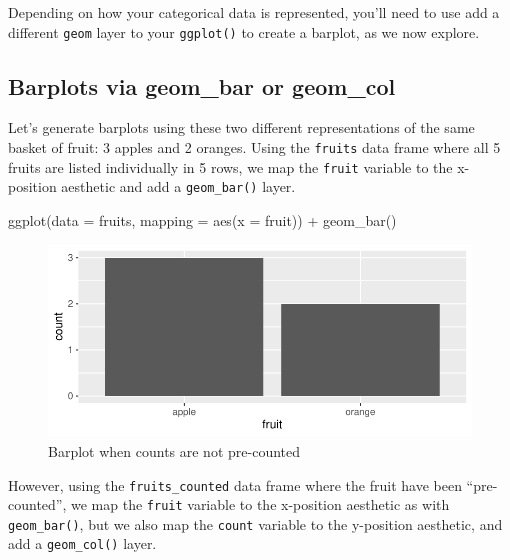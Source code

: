 \documentclass[
  letterpaper,
  DIV=11,
  numbers=noendperiod]{scrreprt}
\newenvironment{Shaded}{\begin{snugshade}}{\end{snugshade}}
\newcommand{\AttributeTok}[1]{\textcolor[rgb]{0.40,0.45,0.13}{#1}}
\newcommand{\FunctionTok}[1]{\textcolor[rgb]{0.28,0.35,0.67}{#1}}
\newcommand{\NormalTok}[1]{\textcolor[rgb]{0.00,0.23,0.31}{#1}}
\newcommand{\SpecialCharTok}[1]{\textcolor[rgb]{0.37,0.37,0.37}{#1}}
\theoremstyle{definition}
\theoremstyle{remark}
\begin{document}
Depending on how your categorical data is represented, you'll need to
use add a different \texttt{geom} layer to your \texttt{ggplot()} to
create a barplot, as we now explore.

\hypertarget{barplots-via-geom_bar-or-geom_col}{%
\subsection{Barplots via geom\_bar or
geom\_col}\label{barplots-via-geom_bar-or-geom_col}}

Let's generate barplots using these two different representations of the
same basket of fruit: 3 apples and 2 oranges. Using the \texttt{fruits}
data frame where all 5 fruits are listed individually in 5 rows, we map
the \texttt{fruit} variable to the x-position aesthetic and add a
\texttt{geom\_bar()} layer.

\begin{Shaded}
\begin{Highlighting}[]
\FunctionTok{ggplot}\NormalTok{(}\AttributeTok{data =}\NormalTok{ fruits, }\AttributeTok{mapping =} \FunctionTok{aes}\NormalTok{(}\AttributeTok{x =}\NormalTok{ fruit)) }\SpecialCharTok{+}
  \FunctionTok{geom\_bar}\NormalTok{()}
\end{Highlighting}
\end{Shaded}

\begin{figure}[H]

{\centering \includegraphics{02-visualization_files/figure-pdf/fig-geombar-1.pdf}

}

\caption{\label{fig-geombar}Barplot when counts are not pre-counted}

\end{figure}

However, using the \texttt{fruits\_counted} data frame where the fruit
have been ``pre-counted'', we map the \texttt{fruit} variable to the
x-position aesthetic as with \texttt{geom\_bar()}, but we also map the
\texttt{count} variable to the y-position aesthetic, and add a
\texttt{geom\_col()} layer.
\end{document}
